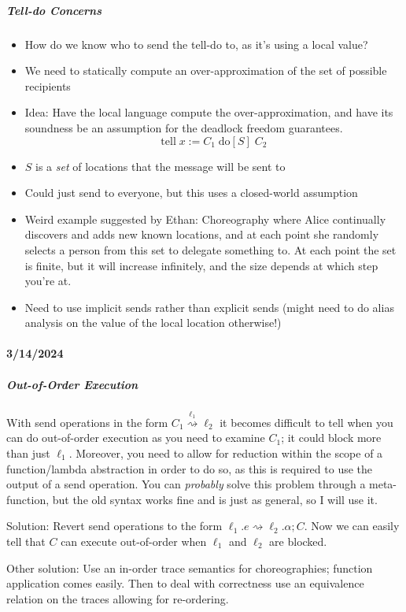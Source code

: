 \documentclass{article}
\theoremstyle{definition}
\begin{document}
\subparagraph{Tell-do Concerns}
\begin{itemize}
	\item How do we know who to send the tell-do to, as it's using a local value?
	\item We need to statically compute an over-approximation of the set of possible recipients
	\item Idea: Have the local language compute the over-approximation, and have its soundness be an assumption for the deadlock freedom guarantees.
	\[
	\text{tell}\; x := C_1 \;\text{do}[S]\; C_2
	\]
	\item $S$ is a \emph{set} of locations that the message will be sent to
	\item Could just send to everyone, but this uses a closed-world assumption
	\item Weird example suggested by Ethan: Choreography where Alice continually discovers and adds new known locations, and at each point she randomly selects a person from this set to delegate something to. At each point the set is finite, but it will increase infinitely, and the size depends at which step you're at.
	\item Need to use implicit sends rather than explicit sends (might need to do alias analysis on the value of the local location otherwise!)
\end{itemize}

\paragraph{3/14/2024}
\subparagraph{Out-of-Order Execution}
With send operations in the form $C_1 \overset{\ell_1}{\rightsquigarrow} \ell_2$ it becomes difficult to tell when you can do out-of-order execution as you need to examine $C_1$; it could block more than just $\ell_1$. Moreover, you need to allow for reduction within the scope of a function/lambda abstraction in order to do so, as this is required to use the output of a send operation. You can \emph{probably} solve this problem through a meta-function, but the old syntax works fine and is just as general, so I will use it.

Solution: Revert send operations to the form $\ell_1.e \rightsquigarrow \ell_2.\alpha; C$. Now we can easily tell that $C$ can execute out-of-order when $\ell_1$ and $\ell_2$ are blocked.

Other solution: Use an in-order trace semantics for choreographies; function application comes easily. Then to deal with correctness use an equivalence relation on the traces allowing for re-ordering.
\end{document}
